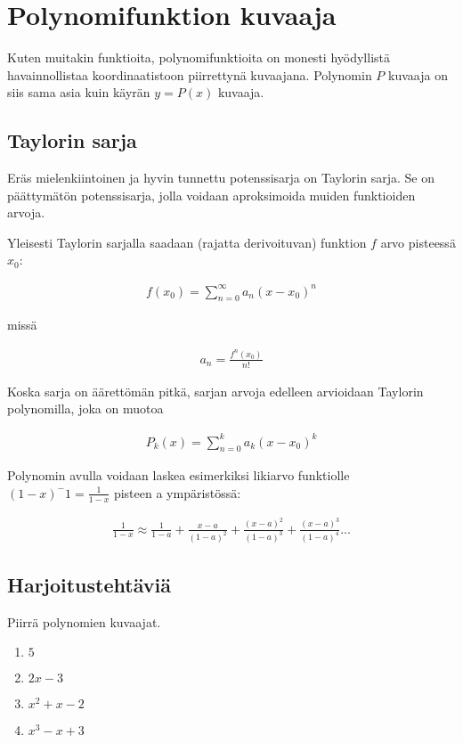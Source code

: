\chapter{Polynomifunktion kuvaaja}
Kuten muitakin funktioita, polynomifunktioita on monesti hyödyllistä
havainnollistaa koordinaatistoon piirrettynä kuvaajana. Polynomin
$P$ kuvaaja on siis sama asia kuin käyrän $y = P(x)$ kuvaaja.

\begin{kuvaajapohja}{1.5}{-2}{2}{-3}{3}
\end{kuvaajapohja}

\section{Taylorin sarja}
Eräs mielenkiintoinen ja hyvin tunnettu potenssisarja on Taylorin sarja.
Se on päättymätön potenssisarja, jolla voidaan aproksimoida muiden funktioiden arvoja.

Yleisesti Taylorin sarjalla saadaan (rajatta derivoituvan) funktion $f$ arvo pisteessä $x_0$:

\begin{align*}
	f(x_0) = \sum\limits_{n=0}^\infty a_n(x-x_0)^n
\end{align*}

missä

\begin{align*}
a_n = \frac{f^n(x_0)}{n!}
\end{align*}

Koska sarja on äärettömän pitkä, sarjan arvoja edelleen arvioidaan Taylorin polynomilla, joka on muotoa

\begin{align*}
	P_k(x) = \sum\limits_{n=0}^k a_k(x-x_0)^k
\end{align*}

Polynomin avulla voidaan laskea esimerkiksi likiarvo funktiolle
$(1-x)^-1 = \frac{1}{1-x}$ pisteen a ympäristössä:

\begin{align*}
	\frac{1}{1-x} \approx \frac{1}{1-a} + \frac{x-a}{(1-a)^2} + \frac{(x-a)^2}{(1-a)^3} + \frac{(x-a)^3}{(1-a)^4} ...
\end{align*}


\section{Harjoitustehtäviä}
\begin{tehtava}
	Piirrä polynomien kuvaajat.
	\begin{enumerate}
		\item $5$
		\item $2x-3$
		\item $x^2+x-2$
		\item $x^3-x+3$
	\end{enumerate}

	\begin{vastaus}
	\end{vastaus}
\end{tehtava}